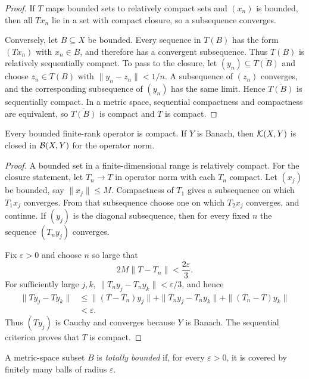 \begin{proof}
If $T$ maps bounded sets to relatively compact sets and $(x_n)$ is bounded,
then all $Tx_n$ lie in a set with compact closure, so a subsequence converges.

Conversely, let $B\subseteq X$ be bounded.  Every sequence in $T(B)$ has the
form $(Tx_n)$ with $x_n\in B$, and therefore has a convergent subsequence.
Thus $T(B)$ is relatively sequentially compact.  To pass to the closure, let
$(y_n)\subseteq\overline{T(B)}$ and choose $z_n\in T(B)$ with
$\|y_n-z_n\|<1/n$.  A subsequence of $(z_n)$ converges, and the corresponding
subsequence of $(y_n)$ has the same limit.  Hence $\overline{T(B)}$ is
sequentially compact.  In a metric space, sequential compactness and
compactness are equivalent, so $\overline{T(B)}$ is compact and $T$ is
compact.
\end{proof}

\begin{notetheorem}
Every bounded finite-rank operator is compact.  If $Y$ is Banach, then
$\mathcal{K}(X,Y)$ is closed in $\mathcal{B}(X,Y)$ for the operator norm.
\end{notetheorem}

\begin{proof}
A bounded set in a finite-dimensional range is relatively compact.  For the
closure statement, let $T_n\to T$ in operator norm with each $T_n$ compact.
Let $(x_j)$ be bounded, say $\|x_j\|\le M$.  Compactness of $T_1$ gives a
subsequence on which $T_1x_j$ converges.  From that subsequence choose one on
which $T_2x_j$ converges, and continue.  If $(y_j)$ is the diagonal
subsequence, then for every fixed $n$ the sequence $(T_ny_j)$ converges.

Fix $\varepsilon>0$ and choose $n$ so large that
\[
  2M\|T-T_n\|<\frac{2\varepsilon}{3}.
\]
For sufficiently large $j,k$,
\(
  \|T_ny_j-T_ny_k\|<\varepsilon/3
\), and hence
\[
\begin{aligned}
  \|Ty_j-Ty_k\|
   &\le \|(T-T_n)y_j\|
       +\|T_ny_j-T_ny_k\|
       +\|(T_n-T)y_k\|\\
   &<\varepsilon.
\end{aligned}
\]
Thus $(Ty_j)$ is Cauchy and converges because $Y$ is Banach.  The sequential
criterion proves that $T$ is compact.
\end{proof}

\begin{notedefinition}
A metric-space subset $B$ is \emph{totally bounded} if, for every
$\varepsilon>0$, it is covered by finitely many balls of radius
$\varepsilon$.
\end{notedefinition}

